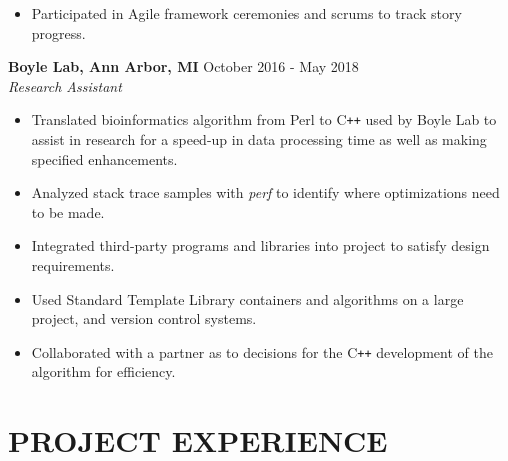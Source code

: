 \documentclass[overlapped]{res}
\begin{document}
\begin{resume}
\begin{itemize}
                  \item Participated in Agile framework ceremonies and 
                  scrums to track story progress.

                \end{itemize}

                \textbf{Boyle Lab, Ann Arbor, MI}
                \hfill October 2016 - May 2018 \\
                {\sl Research Assistant}
                 \begin{itemize}  \itemsep -2pt %
                 \item Translated bioinformatics algorithm from Perl to C\texttt{++}
                 used by Boyle Lab to assist in research  for a
                    speed-up in data processing time as well as making specified enhancements.
                 \item Analyzed stack trace samples with \textit{perf} to identify
                 where optimizations need to be made.
                 
                 \item Integrated third-party programs and libraries into project to satisfy design requirements.
                 \item Used Standard Template Library containers and algorithms on a large project, 
                 and version control systems.
                 \item Collaborated with a partner as to decisions for the 
                 C\texttt{++} development of the algorithm for efficiency.
                \end{itemize}


 \section{PROJECT EXPERIENCE}
      

\end{resume}
\end{document}
